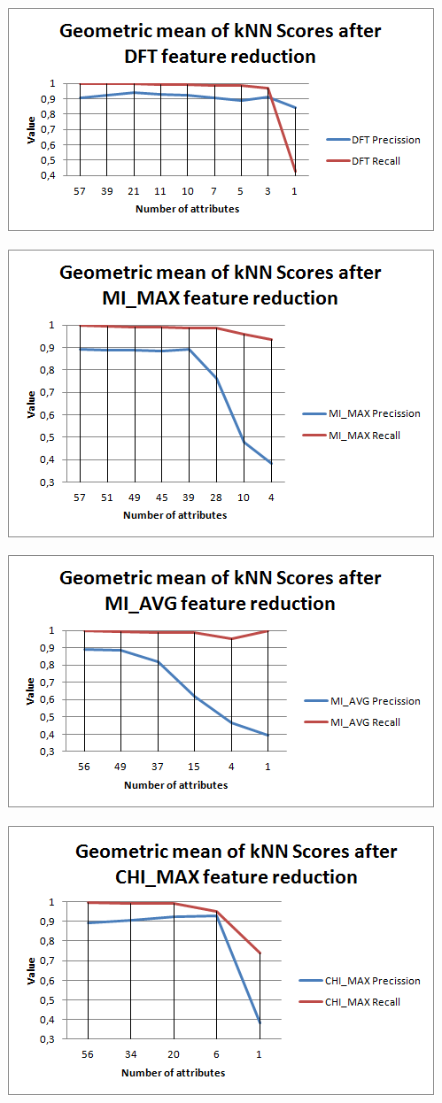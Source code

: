 \documentclass[12pt,a4paper]{report}
\begin{document}
\includegraphics[scale=1]{DFTscores}

\includegraphics[scale=1]{MIMAXscores}

\includegraphics[scale=1]{MIAVGscores}

\includegraphics[scale=1]{CHIMAXscores}
\end{document}
